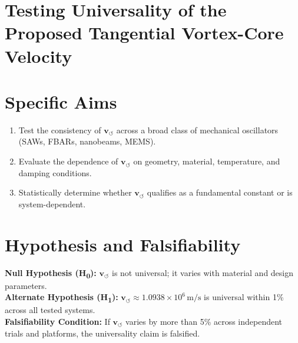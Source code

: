 \documentclass[preprint]{revtex4-2}
\begin{document}
%
%
    \section{\textbf{Testing Universality of the Proposed Tangential Vortex-Core Velocity}}
        \section*{Specific Aims}
        \begin{enumerate}[label=\textbf{Aim \arabic*.}]
            \item Test the consistency of \( \mathbf{v}_{\scriptscriptstyle\boldsymbol{\circlearrowleft}} \) across a broad class of mechanical oscillators (SAWs, FBARs, nanobeams, MEMS).
            \item Evaluate the dependence of \( \mathbf{v}_{\scriptscriptstyle\boldsymbol{\circlearrowleft}} \) on geometry, material, temperature, and damping conditions.
            \item Statistically determine whether \( \mathbf{v}_{\scriptscriptstyle\boldsymbol{\circlearrowleft}} \) qualifies as a fundamental constant or is system-dependent.
        \end{enumerate}

        \section*{Hypothesis and Falsifiability}
        \textbf{Null Hypothesis (H\textsubscript{0}):} \( \mathbf{v}_{\scriptscriptstyle\boldsymbol{\circlearrowleft}} \) is not universal; it varies with material and design parameters.\\
        \textbf{Alternate Hypothesis (H\textsubscript{1}):} \( \mathbf{v}_{\scriptscriptstyle\boldsymbol{\circlearrowleft}} \approx 1.0938 \times 10^6 \, \text{m/s} \) is universal within 1\% across all tested systems.\\

        \noindent\textbf{Falsifiability Condition:} If \( \mathbf{v}_{\scriptscriptstyle\boldsymbol{\circlearrowleft}} \) varies by more than 5\% across independent trials and platforms, the universality claim is falsified.
\end{document}
